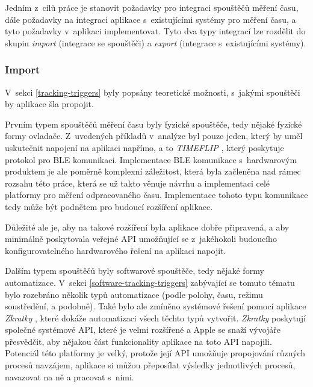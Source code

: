 Jedním z~cílů práce je stanovit požadavky pro integraci spouštěčů měření času, dále požadavky na integraci aplikace s~existujícími systémy pro měření času, a tyto požadavky v~aplikaci implementovat. Tyto dva typy integrací lze rozdělit do skupin \emph{import} (integrace se spouštěči) a \emph{export} (integrace s~existujícími systémy).

\subsubsection{Import}

V~sekci \ref{tracking-triggers} byly popsány teoretické možnosti, s~jakými spouštěči by aplikace šla propojit.

Prvním typem spouštěčů měření času byly fyzické spouštěče, tedy nějaké fyzické formy ovladače. Z~uvedených příkladů v~analýze byl pouze jeden, který by uměl uskutečnit napojení na aplikaci napřímo, a to \emph{TIMEFLIP} \cite{timeflip}, který poskytuje protokol pro BLE komunikaci. Implementace BLE komunikace s~hardwarovým produktem je ale poměrně komplexní záležitost, která byla začleněna nad rámec rozsahu této práce, která se už takto věnuje návrhu a implementaci celé platformy pro měření odpracovaného času. Implementace tohoto typu komunikace tedy může být podnětem pro budoucí rozšíření aplikace.

Důležité ale je, aby na takové rozšíření byla aplikace dobře připravená, a aby minimálně poskytovala veřejné API umožňující se z~jakéhokoli budoucího konfigurovatelného hardwarového řešení na aplikaci napojit.

Dalším typem spouštěčů byly softwarové spouštěče, tedy nějaké formy automatizace. V~sekci \ref{software-tracking-triggers} zabývající se tomuto tématu bylo rozebráno několik typů automatizace (podle polohy, času, režimu soustředění, a podobně). Také bylo ale zmíněno systémové řešení pomocí aplikace \emph{Zkratky} \cite{ios-shortcuts-app}, které dokáže automatizaci všech těchto typů vytvořit. \emph{Zkratky} poskytují společné systémové API, které je velmi rozšířené a Apple se snaží vývojáře přesvědčit, aby nějakou část funkcionality aplikace na toto API napojili. Potenciál této platformy je velký, protože její API umožňuje propojování různých procesů navzájem, aplikace si můžou přeposílat výsledky jednotlivých procesů, navazovat na ně a pracovat s~nimi. 

